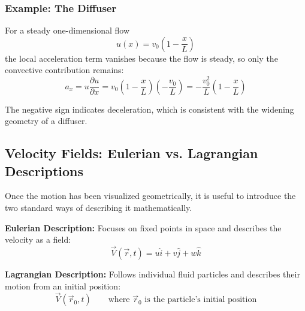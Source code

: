 \subsubsection{Example: The Diffuser}

For a steady one-dimensional flow
\begin{equation}
    u(x)=v_0\left(1-\frac{x}{L}\right)
\end{equation}
the local acceleration term vanishes because the flow is steady, so only the convective contribution remains:
\begin{equation}
    a_x = u\frac{\partial u}{\partial x}
    = v_0\left(1-\frac{x}{L}\right)\left(-\frac{v_0}{L}\right)
    = -\frac{v_0^2}{L}\left(1-\frac{x}{L}\right)
\end{equation}

The negative sign indicates deceleration, which is consistent with the widening geometry of a diffuser.

\subsection{Velocity Fields: Eulerian vs. Lagrangian Descriptions}

Once the motion has been visualized geometrically, it is useful to introduce the two standard ways of describing it mathematically.

\textbf{Eulerian Description:} Focuses on fixed points in space and describes the velocity as a field:
\begin{equation}
    \vec{V}(\vec{r}, t) = u\hat{i} + v\hat{j} + w\hat{k}
\end{equation}

\textbf{Lagrangian Description:} Follows individual fluid particles and describes their motion from an initial position:
\begin{equation}
    \vec{V}(\vec{r}_0, t)
    \qquad \text{where } \vec{r}_0 \text{ is the particle's initial position}
\end{equation}

